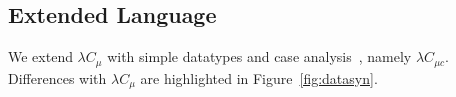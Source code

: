 \newcommand{\Nat}{\mathsf{Nat}} \newcommand{\zero}{\mathsf{zero}}
\newcommand{\suc}{\mathsf{suc}} \newcommand{\plus}{\mathsf{plus}}
\newcommand{\List}{\mathsf{List}} \newcommand{\nil}{\mathsf{nil}}
\newcommand{\cons}{\mathsf{cons}}
\newcommand{\length}{\mathsf{length}}
\newcommand{\PlFunc}{\Nat\rightarrow\Nat\rightarrow\Nat}
\newcommand{\case}{\mathbf{case}} \newcommand{\of}{\mathbf{of}}
\newcommand{\data}{\mathbf{data}} \newcommand{\where}{\mathbf{where}}
\newcommand{\letbb}{\mathbf{let}} \newcommand{\inb}{\mathbf{in}}

\subsection{Extended Language}

We extend $\lambda C_{\mu}$ with simple datatypes and case
analysis~\cite{sulzmann2007system}, namely $\lambda C_{\mu c}$.
Differences with $\lambda C_{\mu}$ are highlighted in
Figure~\ref{fig:datasyn}.

